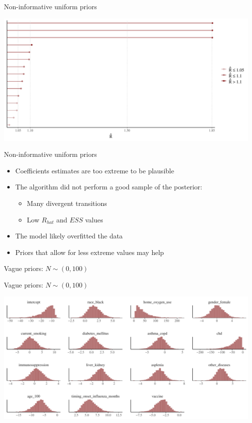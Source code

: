 \documentclass[ignorenonframetext,a4paper]{beamer}
\providecommand{\tightlist}{%
  \setlength{\itemsep}{0pt}\setlength{\parskip}{0pt}}
\begin{document}
\begin{frame}{Non-informative uniform priors}

\includegraphics{DB_presentation_case_study_files/figure-beamer/unnamed-chunk-26-1.pdf}

\end{frame}

\begin{frame}{Non-informative uniform priors}

\begin{itemize}
\item
  Coefficients estimates are too extreme to be plausible
\item
  The algorithm did not perform a good sample of the posterior:

  \begin{itemize}
  \tightlist
  \item
    Many divergent transitions
  \item
    Low \(R_{hat}\) and \(ESS\) values
  \end{itemize}
\item
  The model likely overfitted the data
\item
  Priors that allow for less extreme values may help
\end{itemize}

\end{frame}

\begin{frame}{Vague priors: \(N \sim \left( 0, 100 \right)\)}

\end{frame}

\begin{frame}{Vague priors: \(N \sim \left( 0, 100 \right)\)}

\includegraphics{DB_presentation_case_study_files/figure-beamer/unnamed-chunk-27-1.pdf}

\end{frame}
\end{document}
